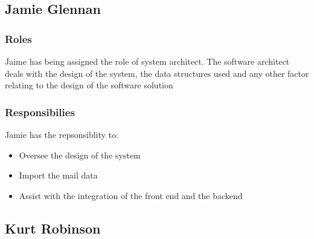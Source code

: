 \begin{itemize}

\subsection{Jamie Glennan}




\subsubsection{Roles}

	Jaime has being assigned the role of system architect. The software architect deals with the design of the system, the data structures used and any other factor relating to the design of the software solution


\subsubsection{Responsibilies}

	Jamie has the repsonsiblity to: 

	\begin{itemize}
		\item Oversee the design of the system
		\item Import the mail data
		\item Assist with the integration of the front end and the backend
	\end{itemize}

\subsection{Kurt Robinson}


\end{itemize}
